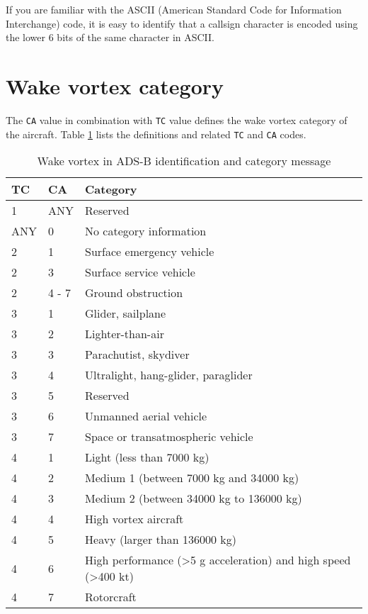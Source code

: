 If you are familiar with the ASCII (American Standard Code for Information Interchange) code, it is easy to identify that a callsign character is encoded using the lower 6 bits of the same character in ASCII.

\section{Wake vortex category}
The \texttt{CA} value in combination with \texttt{TC} value defines the wake vortex category of the aircraft. Table \ref{tb:adsb_id_wake_category} lists the definitions and related \texttt{TC} and \texttt{CA} codes.

\begin{table}[ht]
\caption{Wake vortex in ADS-B identification and category message}
\label{tb:adsb_id_wake_category}
\begin{tabular}{|l|l|l|}
\hline
\textbf{TC} & \textbf{CA} & \textbf{Category} \\ \hline\hline
1 & ANY & Reserved \\ \hline\hline
ANY & 0 & No category information \\ \hline\hline
2 & 1 & Surface emergency vehicle \\ \hline
2 & 3 & Surface service vehicle \\ \hline
2 & 4 - 7 & Ground obstruction \\ \hline\hline
3 & 1 & Glider, sailplane \\ \hline
3 & 2 & Lighter-than-air \\ \hline
3 & 3 & Parachutist, skydiver \\ \hline
3 & 4 & Ultralight, hang-glider, paraglider \\ \hline
3 & 5 & Reserved \\ \hline
3 & 6 & Unmanned aerial vehicle \\ \hline
3 & 7 & Space or transatmospheric vehicle \\ \hline\hline
4 & 1 & Light (less than 7000 kg) \\ \hline
4 & 2 & Medium 1 (between 7000 kg and 34000 kg) \\ \hline
4 & 3 & Medium 2 (between 34000 kg to 136000 kg) \\ \hline
4 & 4 & High vortex aircraft \\ \hline
4 & 5 & Heavy (larger than 136000 kg) \\ \hline
4 & 6 & High performance (\textgreater 5 g acceleration) and high speed (\textgreater 400 kt) \\ \hline
4 & 7 & Rotorcraft \\ \hline
\end{tabular}
\end{table}

